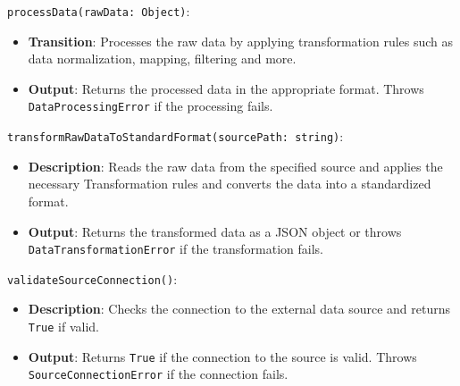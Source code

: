 \documentclass[12pt, titlepage]{article}
\begin{document}
\begin{description}
\begin{description}
\begin{description}
  \texttt{processData(rawData: Object)}:
  \item
  \begin{itemize}
    \item \textbf{Transition}: Processes the raw data by applying transformation rules such as data
    normalization, mapping, filtering and more.
  \end{itemize}
  \item
  \begin{itemize}
    \item \textbf{Output}: Returns the processed data in the appropriate format. Throws \\
    \texttt{DataProcessingError} if the processing fails.
  \end{itemize}
  \item

  \item[Local Function:] 
  \item
  \texttt{transformRawDataToStandardFormat(sourcePath: string)}:
  \item
  \begin{itemize}
    \item \textbf{Description}: Reads the raw data from the specified source and applies the necessary Transformation
    rules and converts the data into a standardized format.
  \end{itemize}
  \item 
  \begin{itemize}
    \item \textbf{Output}: Returns the transformed data as a JSON object or throws \\
    \texttt{DataTransformationError} if the transformation fails.
  \end{itemize}
  \item 

  \texttt{validateSourceConnection()}:
  \item 
  \begin{itemize}
    \item \textbf{Description}: Checks the connection to the external data source and returns \texttt{True} if valid.
  \end{itemize}
  \item 
  \begin{itemize}
    \item \textbf{Output}: Returns \texttt{True} if the connection to the source is valid. Throws \\
   \texttt{SourceConnectionError} if the connection fails.
  \end{itemize}
\end{description}


\end{description}
\end{description}
\end{document}
